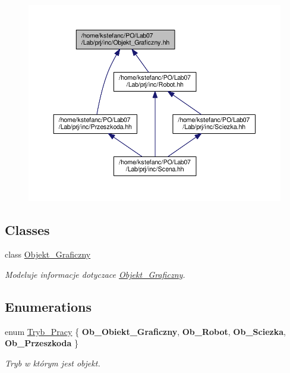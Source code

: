 \begin{figure}[H]
\begin{center}
\leavevmode
\includegraphics[width=350pt]{_objekt___graficzny_8hh__dep__incl}
\end{center}
\end{figure}
\subsection*{Classes}
\begin{DoxyCompactItemize}
\item 
class \hyperlink{class_objekt___graficzny}{Objekt\+\_\+\+Graficzny}
\begin{DoxyCompactList}\small\item\em Modeluje informacje dotyczace \hyperlink{class_objekt___graficzny}{Objekt\+\_\+\+Graficzny}. \end{DoxyCompactList}\end{DoxyCompactItemize}
\subsection*{Enumerations}
\begin{DoxyCompactItemize}
\item 
enum \hyperlink{_objekt___graficzny_8hh_a59b4a471a7481f2a0551d90a8a745c9f}{Tryb\+\_\+\+Pracy} \{ {\bfseries Ob\+\_\+\+Obiekt\+\_\+\+Graficzny}, 
{\bfseries Ob\+\_\+\+Robot}, 
{\bfseries Ob\+\_\+\+Sciezka}, 
{\bfseries Ob\+\_\+\+Przeszkoda}
 \}
\begin{DoxyCompactList}\small\item\em Tryb w którym jest objekt. \end{DoxyCompactList}\end{DoxyCompactItemize}
